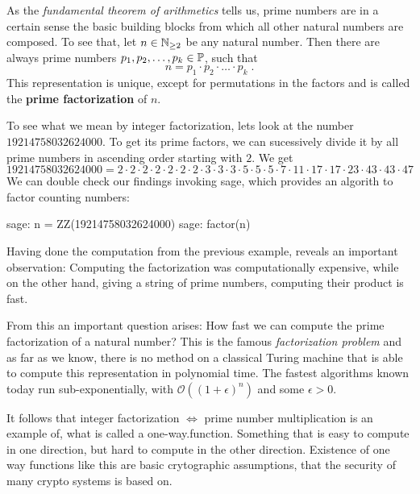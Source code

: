 As the \textit{fundamental theorem of arithmetics} tells us, prime numbers are in a certain sense the basic building blocks from which all other natural numbers are composed. To see that, let $ n \in \mathbb{N}_{\geq 2} $ be any natural number. Then there are always prime numbers $ p_1, p_2, \ldots, p_k \in \mathbb{P} $, such that
\begin{equation}
n = p_1 \cdot p_2 \cdot \ldots \cdot p_k \;.
\end{equation}
This representation is unique, except for permutations in the factors and is called the \textbf{prime factorization} of $n$.
\begin{example} To see what we mean by integer factorization, lets look at the number $19214758032624000$. To get its prime factors, we can sucessively divide it by all prime numbers in ascending order starting with $2$. We get
\begin{equation*}
19214758032624000 = 2\cdot 2\cdot 2\cdot 2\cdot 2\cdot 2\cdot 2 \cdot 3\cdot 3\cdot 3\cdot 5\cdot 5\cdot 5\cdot 7 \cdot 11 \cdot 17\cdot 17 \cdot 23 \cdot 43\cdot 43 \cdot 47
\end{equation*}
We can double check our findings invoking sage, which provides an algorith to factor counting numbers:
\begin{sagecommandline}
sage: n = ZZ(19214758032624000)
sage: factor(n)
\end{sagecommandline}
\end{example}
Having done the computation from the previous example, reveals an important observation: Computing the factorization was computationally expensive, while on the other hand, giving a string of prime numbers, computing their product is fast. 

From this an important question arises: How fast we can compute the prime factorization of a natural number? This is the famous \textit{factorization problem} and as far as we know, there is no method on a classical Turing machine that is able to compute this representation in polynomial time. The fastest algorithms known today run sub-exponentially, with $\mathcal{O}((1+ \epsilon)^n)$ and some $ \epsilon> 0 $.

It follows that integer factorization $\Leftrightarrow$ prime number multiplication is an example of, what is called a one-way.function. Something that is easy to compute in one direction, but hard to compute in the other direction. Existence of one way functions like this are basic crytographic assumptions, that the security of many crypto systems is based on.

